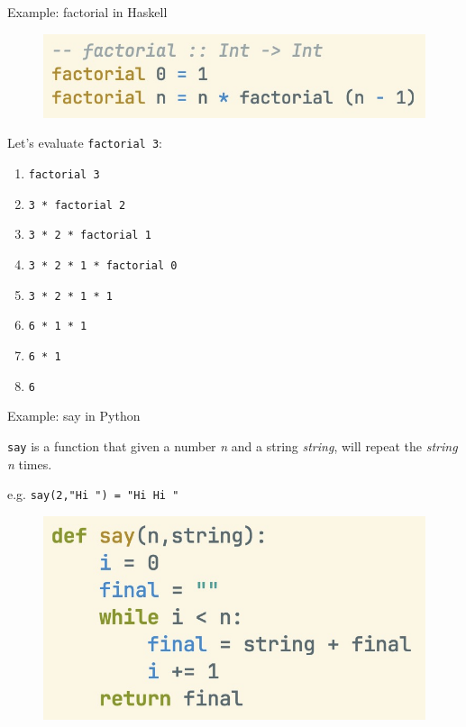 \documentclass[pdf]{beamer}
\begin{document}
\begin{frame}[fragile]{Example: factorial in Haskell}
    \begin{figure}[H]
    \centering
    \includegraphics[width=\linewidth]{factorial-hs}
  \end{figure}

  \pause
  Let's evaluate \verb|factorial 3|:

  \begin{enumerate}
    \item<1-> \verb|factorial 3|
    \item<2-> \verb|3 * factorial 2|
    \item<3-> \verb|3 * 2 * factorial 1|
    \item<4-> \verb|3 * 2 * 1 * factorial 0|
    \item<5-> \verb|3 * 2 * 1 * 1|
    \item<6-> \verb|6 * 1 * 1|
    \item<7-> \verb|6 * 1|
    \item<8-> \verb|6|
  \end{enumerate}

\end{frame}

\begin{frame}[fragile]{Example: say in Python}

  \verb|say| is a function that given a number \textit{n} and a string \textit{string}, will repeat the \textit{string} \textit{n} times.

  e.g. \verb|say(2,"Hi ") = "Hi Hi "|

  \begin{figure}[H]
    \centering
    \includegraphics[width=\linewidth]{say-py}
  \end{figure}

\end{frame}
\end{document}
